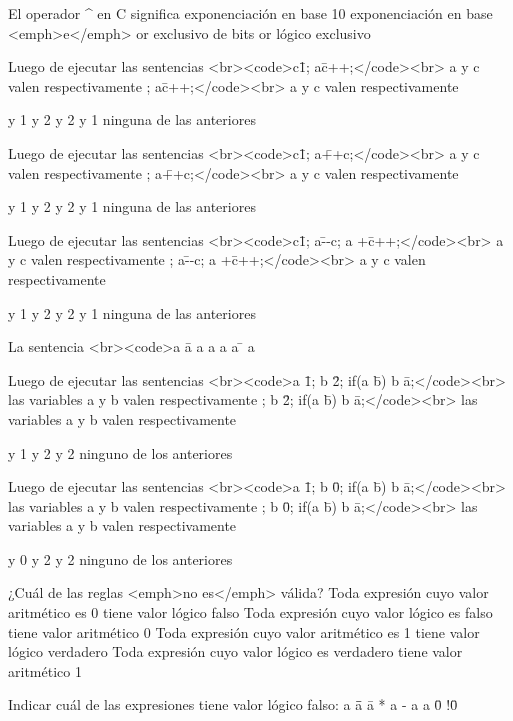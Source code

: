 
\question El operador ^ en C significa
\choice exponenciación en base 10
\choice exponenciación en base <emph>e</emph>
\correctchoice or exclusivo de bits
\choice or lógico exclusivo

\question Luego de ejecutar las sentencias <br><code>c\=1; a\=c++;</code><br> a y c valen respectivamente
; a\=c++;</code><br> a y c valen respectivamente{
 y 1
 y 2
 y 2
 y 1
\choice ninguna de las anteriores

\question Luego de ejecutar las sentencias <br><code>c\=1; a\=++c;</code><br> a y c valen respectivamente
; a\=++c;</code><br> a y c valen respectivamente{
 y 1
 y 2
 y 2
 y 1
\choice ninguna de las anteriores

\question Luego de ejecutar las sentencias <br><code>c\=1; a\=--c; a +\= c++;</code><br> a y c valen respectivamente
; a\=--c; a +\= c++;</code><br> a y c valen respectivamente{
 y 1
 y 2
 y 2
 y 1
\correctchoice ninguna de las anteriores

\question La sentencia <br><code>a \= a %
\correctchoice a %
\choice a%
\correctchoice a %
\choice a \=%
\correctchoice %
\choice a%

\question Luego de ejecutar las sentencias <br><code>a \= 1; b \= 2; if(a \= b) b \= a;</code><br> las variables a y b valen respectivamente 
; b \= 2; if(a \= b) b \= a;</code><br> las variables a y b valen respectivamente {
 y 1
 y 2
 y 2
\choice ninguno de los anteriores

\question Luego de ejecutar las sentencias <br><code>a \= 1; b \= 0; if(a \= b) b \= a;</code><br> las variables a y b valen respectivamente 
; b \= 0; if(a \= b) b \= a;</code><br> las variables a y b valen respectivamente {
 y 0
 y 2
 y 2
\choice ninguno de los anteriores

\question ¿Cuál de las reglas <emph>no es</emph> válida?
\choice Toda expresión cuyo valor aritmético es 0 tiene valor lógico falso
\choice Toda expresión cuyo valor lógico es falso tiene valor aritmético 0
\choice Toda expresión cuyo valor aritmético es 1 tiene valor lógico verdadero
\correctchoice Toda expresión cuyo valor lógico es verdadero tiene valor aritmético 1

\question Indicar cuál de las expresiones tiene valor lógico falso:
\choice a \=\= a
\correctchoice \= a
 * a - a
\correctchoice a \= 0
 !\= 0

}}}}}

